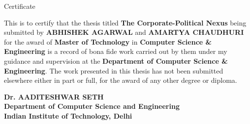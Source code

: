 \begin{center}
\LARGE{ Certificate}
\end{center}

\vspace{0.5in}

This is to certify that the thesis titled {\bfseries The Corporate-Political Nexus} being submitted by {\bfseries ABHISHEK AGARWAL} and {\bfseries AMARTYA CHAUDHURI} for the award of {\bfseries Master of Technology} in {\bfseries Computer Science \& Engineering} is a record of bona fide work carried out by them under my guidance and supervision at the {\bfseries Department of Computer Science \& Engineering}. The work presented in this thesis has not been submitted elsewhere either in part or full, for the award of any other degree or diploma.

\vspace{1.5in}


{\bfseries Dr. AADITESHWAR SETH} \\
{\bfseries Department of Computer Science and Engineering} \\
{\bfseries Indian Institute of Technology, Delhi}\\
